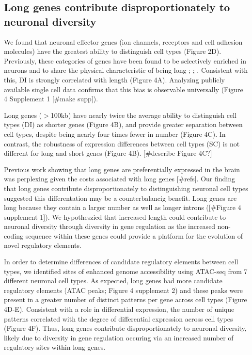 \subsection{Long genes contribute disproportionately to neuronal diversity}

We found that neuronal effector genes (ion channels, receptors and cell adhesion molecules) have the greatest ability to distinguish cell types (Figure 2D). Previously, these categories of genes have been found to be selectively enriched in neurons and to share the physical characteristic of being long \cite{Sugino_2014}; \cite{Gabel_2015}; \cite{Zylka_2015}. Consistent with this, DI is strongly correlated with length (Figure 4A). Analyzing publicly available single cell data confirms that this bias is observable universally (Figure 4 Supplement 1 [#make supp]). 

Long genes ($\gt$100kb) have nearly twice the average ability to distinguish cell types (DI) as shorter genes (Figure 4B), and provide greater separation between cell types, despite being nearly four times fewer in number (Figure 4C). In contrast, the robustness of expression differences between cell types (SC) is not different for long and short genes (Figure 4B). [#describe Figure 4C?] 

Previous work showing that long genes are preferentially expressed in the brain was perplexing given the costs associated with long genes [#refs]. Our finding that long genes contribute disproportionately to distinguishing neuronal cell types suggested this differentation may be a counterbalancig benefit. Long genes are long because they contain a larger number as well as longer introns ([#Figure 4 supplement 1]). We hypotheszied that increased length could contribute to neuronal diversity through diversity in gene regulation as the increased non-coding sequence within these genes could provide a platform for the evolution of novel regulatory elements.

In order to determine differences of candidate regulatory elements between cell types, we identified sites of enhanced genome accessibility using ATAC-seq \cite{Buenrostro_2013} from 7 different neuronal cell types. As expected, long genes had more candidate regulatory elements (ATAC peaks; Figure 4 supplement 2) and these peaks were present in a greater number of distinct patterns per gene across cell types (Figure 4D-E). Consistent with a role in differential expression, the number of unique patterns correlated with the degree of differential expression across cell types (Figure 4F). Thus, long genes contribute disproportionately to neuronal diversity, likely due to diversity in gene regulation occuring via an increased number of regulatory sites within long genes. 


